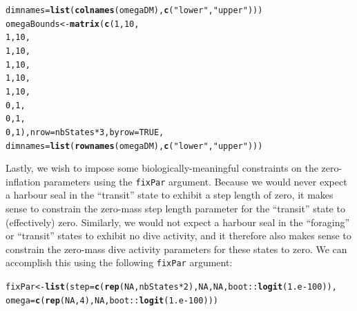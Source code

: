 \documentclass[12pt]{article}\usepackage[]{graphicx}\usepackage[]{color}
\makeatletter
\newcommand{\hlnum}[1]{\textcolor[rgb]{0.686,0.059,0.569}{#1}}%
\newcommand{\hlstr}[1]{\textcolor[rgb]{0.192,0.494,0.8}{#1}}%
\newcommand{\hlopt}[1]{\textcolor[rgb]{0,0,0}{#1}}%
\newcommand{\hlstd}[1]{\textcolor[rgb]{0.345,0.345,0.345}{#1}}%
\newcommand{\hlkwb}[1]{\textcolor[rgb]{0.69,0.353,0.396}{#1}}%
\newcommand{\hlkwc}[1]{\textcolor[rgb]{0.333,0.667,0.333}{#1}}%
\newcommand{\hlkwd}[1]{\textcolor[rgb]{0.737,0.353,0.396}{\textbf{#1}}}%
\newenvironment{kframe}{%
 \def\at@end@of@kframe{}%
 \ifinner\ifhmode%
  \def\at@end@of@kframe{\end{minipage}}%
  \begin{minipage}{\columnwidth}%
 \fi\fi%
 \def\FrameCommand##1{\hskip\@totalleftmargin \hskip-\fboxsep
 \colorbox{shadecolor}{##1}\hskip-\fboxsep
     \hskip-\linewidth \hskip-\@totalleftmargin \hskip\columnwidth}%
 \MakeFramed {\advance\hsize-\width
   \@totalleftmargin\z@ \linewidth\hsize
   \@setminipage}}%
 {\par\unskip\endMakeFramed%
 \at@end@of@kframe}
\newenvironment{knitrout}{}{} %
\makeatother
\begin{document}
\begin{knitrout}
\begin{kframe}
\begin{alltt}
                          \hlkwc{dimnames}\hlstd{=}\hlkwd{list}\hlstd{(}\hlkwd{colnames}\hlstd{(omegaDM),}\hlkwd{c}\hlstd{(}\hlstr{"lower"}\hlstd{,}\hlstr{"upper"}\hlstd{)))}
\hlstd{omegaBounds} \hlkwb{<-} \hlkwd{matrix}\hlstd{(}\hlkwd{c}\hlstd{(}\hlnum{1}\hlstd{,}\hlnum{10}\hlstd{,}
                        \hlnum{1}\hlstd{,}\hlnum{10}\hlstd{,}
                        \hlnum{1}\hlstd{,}\hlnum{10}\hlstd{,}
                        \hlnum{1}\hlstd{,}\hlnum{10}\hlstd{,}
                        \hlnum{1}\hlstd{,}\hlnum{10}\hlstd{,}
                        \hlnum{1}\hlstd{,}\hlnum{10}\hlstd{,}
                        \hlnum{0}\hlstd{,}\hlnum{1}\hlstd{,}
                        \hlnum{0}\hlstd{,}\hlnum{1}\hlstd{,}
                        \hlnum{0}\hlstd{,}\hlnum{1}\hlstd{),}\hlkwc{nrow}\hlstd{=nbStates}\hlopt{*}\hlnum{3}\hlstd{,}\hlkwc{byrow}\hlstd{=}\hlnum{TRUE}\hlstd{,}
                      \hlkwc{dimnames}\hlstd{=}\hlkwd{list}\hlstd{(}\hlkwd{rownames}\hlstd{(omegaDM),}\hlkwd{c}\hlstd{(}\hlstr{"lower"}\hlstd{,}\hlstr{"upper"}\hlstd{)))}
\end{alltt}
\end{kframe}
\end{knitrout}
Lastly, we wish to impose some biologically-meaningful constraints on the zero-inflation parameters using the \verb|fixPar| argument. Because we would never expect a harbour seal in the ``transit'' state to exhibit a step length of zero, it makes sense to constrain the zero-mass step length parameter for the ``transit'' state to (effectively) zero.  Similarly, we would not expect a harbour seal in the ``foraging'' or ``transit'' states to exhibit no dive activity, and it therefore also makes sense to constrain the zero-mass dive activity parameters for these states to zero.  We can accomplish this using the following \verb|fixPar| argument:
\begin{knitrout}
\color{fgcolor}\begin{kframe}
\begin{alltt}
\hlstd{fixPar} \hlkwb{<-} \hlkwd{list}\hlstd{(}\hlkwc{step}\hlstd{=}\hlkwd{c}\hlstd{(}\hlkwd{rep}\hlstd{(}\hlnum{NA}\hlstd{,nbStates}\hlopt{*}\hlnum{2}\hlstd{),}\hlnum{NA}\hlstd{,}\hlnum{NA}\hlstd{,boot}\hlopt{::}\hlkwd{logit}\hlstd{(}\hlnum{1.e-100}\hlstd{)),}
             \hlkwc{omega}\hlstd{=}\hlkwd{c}\hlstd{(}\hlkwd{rep}\hlstd{(}\hlnum{NA}\hlstd{,}\hlnum{4}\hlstd{),}\hlnum{NA}\hlstd{,boot}\hlopt{::}\hlkwd{logit}\hlstd{(}\hlnum{1.e-100}\hlstd{)))}
\end{alltt}
\end{kframe}
\end{knitrout}
\end{document}

